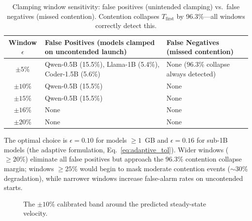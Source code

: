 \documentclass[11pt,a4paper]{article}
\newcommand{\Tfirst}{T_{\mathrm{first}}}
\begin{document}
\begin{table}[h]
\centering
\caption{Clamping window sensitivity: false positives (unintended clamping) vs.\ false negatives (missed contention). Contention collapses $\Tfirst$ by 96.3\%---all windows correctly detect this.}\label{tab:window_sensitivity}
\small
\begin{tabularx}{\linewidth}{@{}cLL@{}}
\toprule
\textbf{Window $\epsilon$} & \textbf{False Positives (models clamped on uncontended launch)} & \textbf{False Negatives (missed contention)} \\
\midrule
$\pm 5\%$  & Qwen-0.5B (15.5\%), Llama-1B (5.4\%), Coder-1.5B (5.6\%) & None (96.3\% collapse always detected) \\
$\pm 10\%$ & Qwen-0.5B (15.5\%) & None \\
$\pm 15\%$ & Qwen-0.5B (15.5\%) & None \\
$\pm 16\%$ & None & None \\
$\pm 20\%$ & None & None \\
\bottomrule
\end{tabularx}
\end{table}

\noindent The optimal choice is $\epsilon = 0.10$ for models $\geq 1$~GB and $\epsilon = 0.16$ for sub-1B models (the adaptive formulation, Eq.~\ref{eq:adaptive_tol}). Wider windows ($\geq 20\%$) eliminate all false positives but approach the 96.3\% contention collapse margin; windows $\geq 25\%$ would begin to mask moderate contention events ($\sim$30\% degradation), while narrower windows increase false-alarm rates on uncontended starts.

\begin{figure}[h]
\centering
{}
\caption{The $\pm10\%$ calibrated band around the predicted steady-state velocity.}\label{fig:band}
\end{figure}
\end{document}
